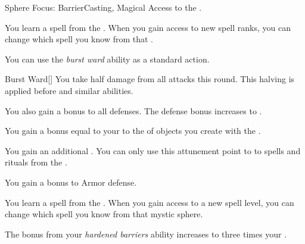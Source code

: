     \begin{feat}{Sphere Focus: Barrier}{Casting, Magical}
        \featpre Access to the  .

         You learn a spell from the  .
        When you gain access to new spell ranks, you can change which spell you know from that .

         You can use the \textit{burst ward} ability as a standard action.
        \begin{freeability}{Burst Ward}[]
            You take half damage from all attacks this round.
            This halving is applied before  and similar abilities.

            \rankline
             You also gain a  bonus to all defenses.
             The defense bonus increases to .
        \end{freeability}

         You gain a bonus equal to your  to the  of objects you create with the  .

         You gain an additional .
        You can only use this attunement point to  to spells and rituals from the  .

         You gain a  bonus to Armor defense.

         You learn a spell from the  .
        When you gain access to a new spell level, you can change which spell you know from that mystic sphere.

         The bonus from your \textit{hardened barriers} ability increases to three times your .
    \end{feat}

